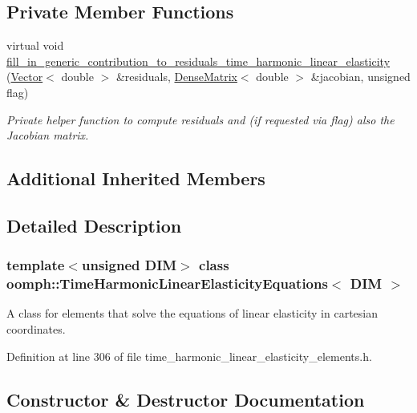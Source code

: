 \subsection*{Private Member Functions}
\begin{DoxyCompactItemize}
\item 
virtual void \hyperlink{classoomph_1_1TimeHarmonicLinearElasticityEquations_a1cbce23da8fa56642335a45651133a2a}{fill\+\_\+in\+\_\+generic\+\_\+contribution\+\_\+to\+\_\+residuals\+\_\+time\+\_\+harmonic\+\_\+linear\+\_\+elasticity} (\hyperlink{classoomph_1_1Vector}{Vector}$<$ double $>$ \&residuals, \hyperlink{classoomph_1_1DenseMatrix}{Dense\+Matrix}$<$ double $>$ \&jacobian, unsigned flag)
\begin{DoxyCompactList}\small\item\em Private helper function to compute residuals and (if requested via flag) also the Jacobian matrix. \end{DoxyCompactList}\end{DoxyCompactItemize}
\subsection*{Additional Inherited Members}


\subsection{Detailed Description}
\subsubsection*{template$<$unsigned D\+IM$>$\newline
class oomph\+::\+Time\+Harmonic\+Linear\+Elasticity\+Equations$<$ D\+I\+M $>$}

A class for elements that solve the equations of linear elasticity in cartesian coordinates. 

Definition at line 306 of file time\+\_\+harmonic\+\_\+linear\+\_\+elasticity\+\_\+elements.\+h.



\subsection{Constructor \& Destructor Documentation}
\mbox{\label{classoomph_1_1TimeHarmonicLinearElasticityEquations_aded4f05223218f5b23728d85a15c743b}} 
